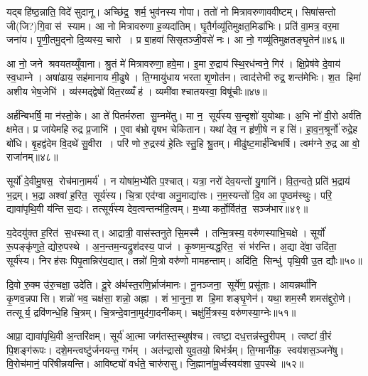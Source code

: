 यद्बहि॑ष्ठ॒न्नाति॒ विदे॑ सुदानू। अच्छि॑द्र॒ शर्म॒ भुव॑नस्य गोपा। ततो॑ नो मित्रावरुणाववीष्टम्। सिषा॑सन्तो जी(जि?)गि॒वास॑ स्याम। आ नो मित्रावरुणा ह॒व्यदा॑तिम्। घृ॒तैर्गव्यू॑तिमुक्षत॒मिडा॑भिः। प्रति॑ वा॒मत्र॒ वर॒मा जना॑य। पृ॒णी॒तमु॒द्नो दि॒व्यस्य॒ चारो। प्र बा॒हवा॑ सिसृतञ्जी॒वसे॑ नः। आ नो॒ गव्यू॑तिमुक्षतङ्घृ॒तेन॑॥४६॥

आ नो॒ जने श्रवयतय्युँवाना। श्रु॒तं मे॑ मित्रावरुणा॒ हवे॒मा। इ॒मा रु॒द्राय॑ स्थि॒रध॑न्वने॒ गिर॑। क्षि॒प्रेष॑वे दे॒वाय॑ स्व॒धाम्ने। अषा॑ढाय॒ सह॑मानाय मी॒ढुषे। ति॒ग्मायु॑धाय भरता शृ॒णोत॑न। त्वाद॑त्तेभी रुद्र॒ शन्त॑मेभिः। श॒त हिमा॑ अशीय भेष॒जेभि॑। व्य॑स्मद्द्वेषो॑ वित॒रव्व्यँह॑। व्यमी॑वाश्चातयस्वा॒ विषू॑चीः॥४७॥

अर्\mbox{}ह॑न्बिभर्\mbox{}षि॒ मा न॑स्तो॒के। आ ते॑ पितर्मरुता सु॒म्नमे॑तु। मा न॒ सूर्य॑स्य स॒न्दृशो॑ युयोथाः। अ॒भि नो॑ वी॒रो अर्व॑ति क्षमेत। प्र जा॑येमहि रुद्र प्र॒जाभि॑। ए॒वा ब॑भ्रो वृषभ चेकितान। यथा॑ देव॒ न हृ॑णी॒षे न हसि॑। हा॒व॒न॒श्रूर्नो॑ रुद्रे॒ह बो॑धि। बृ॒हद्व॑देम वि॒दथे॑ सु॒वीरा। परि॑ णो रु॒द्रस्य॑ हे॒तिः स्तु॒हि श्रु॒तम्। मीढु॑ष्ट॒मार्\mbox{}ह॑न्बिभर्\mbox{}षि। त्वम॑ग्ने रु॒द्र आ वो॒ राजा॑नम्॥४८॥\anuvakamend[वसू॑नि ततानास्तु॒ विश्वान्॑ ववृत्यां ववर्ति घृ॒तेन॒ विषू॑चीः श्रु॒तन्द्वे च॑]

सूर्यो॑ दे॒वीमु॒षस॒ रोच॑माना॒मर्य॑। न योषा॑म॒भ्ये॑ति प॒श्चात्। यत्रा॒ नरो॑ देव॒यन्तो॑ यु॒गानि॑। वि॒त॒न्वते॒ प्रति॑ भ॒द्राय॑ भ॒द्रम्। भ॒द्रा अश्वा॑ ह॒रित॒ सूर्य॑स्य। चि॒त्रा एद॑ग्वा अनु॒माद्या॑सः। न॒म॒स्यन्तो॑ दि॒व आ पृ॒ष्ठम॑स्थुः। परि॒ द्यावा॑पृथि॒वी य॑न्ति स॒द्यः। तत्सूर्य॑स्य देव॒त्वन्तन्म॑हि॒त्वम्। म॒ध्या कर्तो॒र्वित॑त॒ सञ्ज॑भार॥४९॥

य॒देदयु॑क्त ह॒रित॑ स॒धस्थात्। आद्रात्री॒ वास॑स्तनुते सि॒मस्मै। तन्मि॒त्रस्य॒ वरु॑णस्याभि॒चक्षे। सूर्यो॑ रू॒पङ्कृ॑णुते॒ द्योरु॒पस्थे। अ॒न॒न्तम॒न्यद्रुश॑दस्य॒ पाज॑। कृ॒ष्णम॒न्यद्ध॒रित॒ सं भ॑रन्ति। अ॒द्या दे॑वा॒ उदि॑ता॒ सूर्य॑स्य। निरह॑सः पिपृ॒तान्निर॑व॒द्यात्। तन्नो॑ मि॒त्रो वरु॑णो मामहन्ताम्। अदि॑ति॒ सिन्धु॑ पृथि॒वी उ॒त द्यौः॥५०॥

दि॒वो रु॒क्म उ॑रु॒चक्षा॒ उदे॑ति। दू॒रे अ॑र्थस्त॒रणि॒र्भ्राज॑मानः। नू॒नञ्जना॒ सूर्ये॑ण॒ प्रसू॑ताः। आयन्नर्था॑नि कृ॒णव॒न्नपासि। शन्नो॑ भव॒ चक्ष॑सा॒ शन्नो॒ अह्ना। शं भा॒नुना॒ श हि॒मा शङ्घृ॒णेन॑। यथा॒ शम॒स्मै शमस॑द्दुरो॒णे। तत्सूर्य॒ द्रवि॑णन्धे॒हि चि॒त्रम्। चि॒त्रन्दे॒वाना॒मुद॑गा॒दनी॑कम्। चक्षु॑र्मि॒त्रस्य॒ वरु॑णस्या॒ग्नेः॥५१॥

आप्रा॒ द्यावा॑पृथि॒वी अ॒न्तरि॑क्षम्। सूर्य॑ आ॒त्मा जग॑तस्त॒स्थुष॑श्च। त्वष्टा॒ दध॒त्तन्न॑स्तु॒रीपम्। त्वष्टा॑ वी॒रं पि॒शङ्ग॑रूपः। दशे॒मन्त्वष्टु॑र्जनयन्त॒ गर्भम्। अत॑न्द्रासो युव॒तयो॒ बिभ॑र्त्रम्। ति॒ग्मानी॑क॒ स्वय॑शस॒ञ्जने॑षु। वि॒रोच॑मानं॒ परि॑षीन्नयन्ति। आविष्ट्यो॑ वर्धते॒ चारु॑रासु। जि॒ह्माना॑मू॒र्ध्वस्वय॑शा उ॒पस्थे॥५२॥

